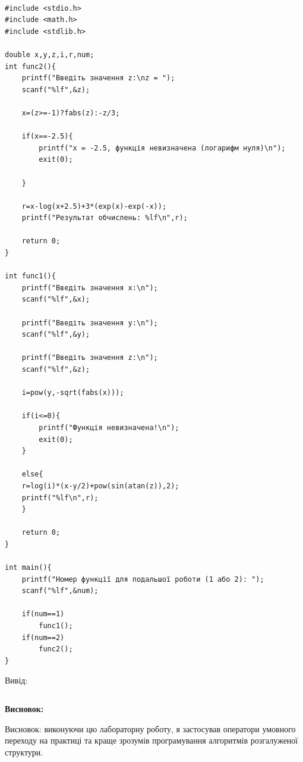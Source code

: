 \documentclass{article}
\begin{document}
\begin{lstlisting}[frame=single]

#include <stdio.h>
#include <math.h>
#include <stdlib.h>

double x,y,z,i,r,num;
int func2(){
	printf("Введіть значення z:\nz = ");
	scanf("%lf",&z);

	x=(z>=-1)?fabs(z):-z/3;

	if(x==-2.5){
		printf("x = -2.5, функція невизначена (логарифм нуля)\n");
		exit(0);

	}

	r=x-log(x+2.5)+3*(exp(x)-exp(-x));
	printf("Результат обчислень: %lf\n",r);

	return 0;
}

int func1(){
	printf("Введіть значення x:\n");
	scanf("%lf",&x);

	printf("Введіть значення y:\n");
	scanf("%lf",&y);

	printf("Введіть значення z:\n");
	scanf("%lf",&z);

	i=pow(y,-sqrt(fabs(x)));

	if(i<=0){
		printf("Функція невизначена!\n");
		exit(0);
	}

	else{
	r=log(i)*(x-y/2)+pow(sin(atan(z)),2);
	printf("%lf\n",r);
	}

	return 0;
}

int main(){
	printf("Номер функції для подальшої роботи (1 або 2): ");
	scanf("%lf",&num);

	if(num==1)
		func1();
	if(num==2)
		func2();
}

\end{lstlisting}

{\fontsize{14}{16.1}\selectfont
Вивід:}

\begin{lstlisting}

\end{lstlisting}

{\fontsize{14}{16.1}\selectfont
\textbf{Висновок:}

Висновок: виконуючи цю лабораторну роботу, я застосував оператори умовного переходу на
практиці та краще зрозумів програмування алгоритмів розгалуженої структури.

}
\end{document}
